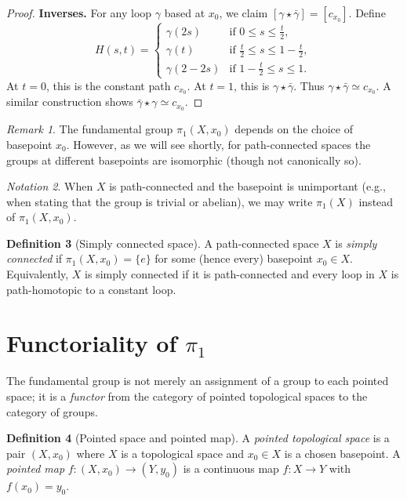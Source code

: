 \documentclass[12pt,a4paper,openany]{book}
\theoremstyle{definition}
\newtheorem{definition}{Definition}[chapter]
\theoremstyle{plain}
\theoremstyle{remark}
\newtheorem{remark}[definition]{Remark}
\newtheorem{notation}[definition]{Notation}
\begin{document}
\begin{proof}
\textbf{Inverses.} For any loop $\gamma$ based at $x_0$, we claim $[\gamma
\star \bar{\gamma}] = [c_{x_0}]$. Define
\[
  H(s, t) = \begin{cases}
    \gamma(2s) & \text{if } 0 \le s \le \tfrac{t}{2}, \\
    \gamma(t) & \text{if } \tfrac{t}{2} \le s \le 1 - \tfrac{t}{2}, \\
    \gamma(2 - 2s) & \text{if } 1 - \tfrac{t}{2} \le s \le 1.
  \end{cases}
\]
At $t = 0$, this is the constant path $c_{x_0}$. At $t = 1$, this is $\gamma
\star \bar{\gamma}$. Thus $\gamma \star \bar{\gamma} \simeq c_{x_0}$. A similar
construction shows $\bar{\gamma} \star \gamma \simeq c_{x_0}$.
\end{proof}

\begin{remark}\label{rem:pi1-pointed}
The fundamental group $\pi_1(X, x_0)$ depends on the choice of basepoint $x_0$.
However, as we will see shortly, for path-connected spaces the groups at
different basepoints are isomorphic (though not canonically so).
\end{remark}

\begin{notation}\label{not:pi1}
When $X$ is path-connected and the basepoint is unimportant (e.g., when stating
that the group is trivial or abelian), we may write $\pi_1(X)$ instead of
$\pi_1(X, x_0)$.
\end{notation}

\begin{definition}[Simply connected space]\label{def:simply-connected}
A path-connected space $X$ is \emph{simply connected} if
$\pi_1(X, x_0) = \{e\}$ for some (hence every) basepoint $x_0 \in X$. Equivalently,
$X$ is simply connected if it is path-connected and every loop in $X$ is
path-homotopic to a constant loop.
\end{definition}


\section{Functoriality of $\pi_1$}\label{sec:functoriality}

The fundamental group is not merely an assignment of a group to each pointed
space; it is a \emph{functor} from the category of pointed topological spaces to
the category of groups.

\begin{definition}[Pointed space and pointed map]\label{def:pointed-space}
A \emph{pointed topological space} is a pair $(X, x_0)$
where $X$ is a topological space and $x_0 \in X$ is a chosen basepoint. A
\emph{pointed map} $f \colon (X, x_0) \to (Y, y_0)$ is a continuous map
$f \colon X \to Y$ with $f(x_0) = y_0$.
\end{definition}
\end{document}
